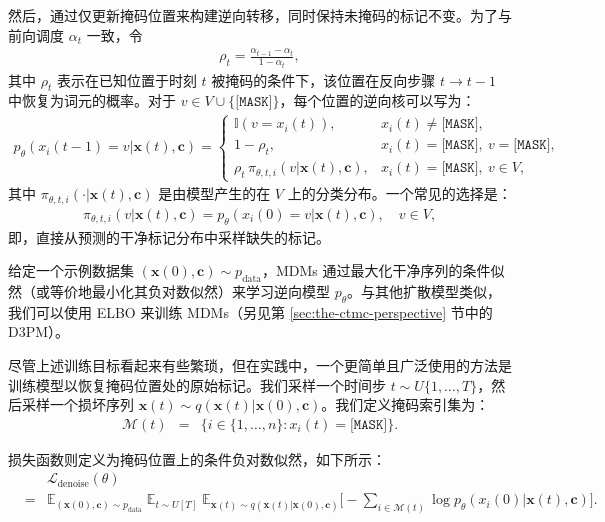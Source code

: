 \noindent 然后，通过仅更新掩码位置来构建逆向转移，同时保持未掩码的标记不变。为了与前向调度 $\alpha_t$ 一致，令
\begin{eqnarray}
\rho_t=\frac{\alpha_{t-1}-\alpha_t}{1-\alpha_t},
\label{eq:mdm-unmask-probability}
\end{eqnarray}
其中 $\rho_t$ 表示在已知位置于时刻 $t$ 被掩码的条件下，该位置在反向步骤 $t\to t-1$ 中恢复为词元的概率。对于 $v\in V\cup\{\texttt{[MASK]}\}$，每个位置的逆向核可以写为：
\begin{eqnarray}
p_\theta(x_i(t-1)=v| \mathbf{x}(t), \mathbf{c})
=
\begin{cases}
\mathbb{I}\!\left(v=x_i(t)\right), & x_i(t) \neq \texttt{[MASK]},\\
1-\rho_t, & x_i(t)=\texttt{[MASK]},\ v=\texttt{[MASK]},\\
\rho_t\,\pi_{\theta,t,i}\!\left(v | \mathbf{x}(t), \mathbf{c}\right),
& x_i(t)=\texttt{[MASK]},\ v\in V,
\end{cases}
\label{eq:mdm-reverse-keep-or-sample}
\end{eqnarray}
其中 $\pi_{\theta,t,i}(\cdot | \mathbf{x}(t),\mathbf{c})$ 是由模型产生的在 $V$ 上的分类分布。一个常见的选择是：
\begin{eqnarray}
\pi_{\theta,t,i}\!\left(v | \mathbf{x}(t),\mathbf{c}\right)=p_\theta\!\left(x_i(0)=v | \mathbf{x}(t),\mathbf{c}\right), \quad v\in V,
\label{eq:mdm-pi-as-denoise}
\end{eqnarray}
即，直接从预测的干净标记分布中采样缺失的标记。

给定一个示例数据集 $(\mathbf{x}(0),\mathbf{c})\sim p_{\text{data}}$，MDMs 通过最大化干净序列的条件似然（或等价地最小化其负对数似然）来学习逆向模型 $p_\theta$。与其他扩散模型类似，我们可以使用 ELBO 来训练 MDMs（另见第 \ref{sec:the-ctmc-perspective} 节中的 D3PM）。

尽管上述训练目标看起来有些繁琐，但在实践中，一个更简单且广泛使用的方法是训练模型以恢复掩码位置处的原始标记。我们采样一个时间步 $t\sim U\{1,\dots,T\}$，然后采样一个损坏序列 $\mathbf{x}(t)\sim q(\mathbf{x}(t)| \mathbf{x}(0),\mathbf{c})$。我们定义掩码索引集为：
\begin{eqnarray}
\mathcal{M}(t) & = & \{i\in\{1,\dots,n\} : x_i(t)=\texttt{[MASK]}\}.
\end{eqnarray}

\noindent 损失函数则定义为掩码位置上的条件负对数似然，如下所示：
\begin{eqnarray}
& & \mathcal{L}_{\text{denoise}}(\theta) \nonumber \\
&=&
\mathbb{E}_{(\mathbf{x}(0),\mathbf{c})\sim p_{\text{data}}}
\;
\mathbb{E}_{t\sim U[T]}
\;
\mathbb{E}_{\mathbf{x}(t)\sim q(\mathbf{x}(t)| \mathbf{x}(0),\mathbf{c})}
\Bigg[
-\sum_{i\in \mathcal{M}(t)} \log p_\theta\!\left(x_i(0)| \mathbf{x}(t),\mathbf{c}\right)
\Bigg].
\label{eq:mdm-denoise-ce}
\end{eqnarray}

